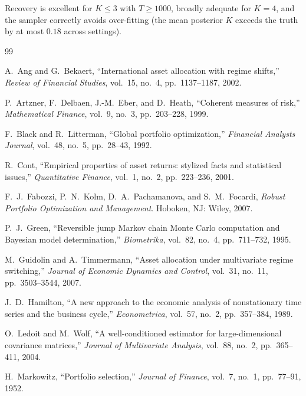 \documentclass[12pt,oneside]{book}
\begin{document}
Recovery is excellent for $K \leq 3$ with $T \geq 1000$, broadly adequate for $K=4$, and the sampler correctly avoids over-fitting (the mean posterior $K$ exceeds the truth by at most $0.18$ across settings).

\begin{thebibliography}{99}

 A.\ Ang and G.\ Bekaert, ``International asset allocation with regime shifts,'' \textit{Review of Financial Studies}, vol.\ 15, no.\ 4, pp.\ 1137--1187, 2002.

 P.\ Artzner, F.\ Delbaen, J.-M.\ Eber, and D.\ Heath, ``Coherent measures of risk,'' \textit{Mathematical Finance}, vol.\ 9, no.\ 3, pp.\ 203--228, 1999.

 F.\ Black and R.\ Litterman, ``Global portfolio optimization,'' \textit{Financial Analysts Journal}, vol.\ 48, no.\ 5, pp.\ 28--43, 1992.

 R.\ Cont, ``Empirical properties of asset returns: stylized facts and statistical issues,'' \textit{Quantitative Finance}, vol.\ 1, no.\ 2, pp.\ 223--236, 2001.

 F.\ J.\ Fabozzi, P.\ N.\ Kolm, D.\ A.\ Pachamanova, and S.\ M.\ Focardi, \textit{Robust Portfolio Optimization and Management}. Hoboken, NJ: Wiley, 2007.

 P.\ J.\ Green, ``Reversible jump Markov chain Monte Carlo computation and Bayesian model determination,'' \textit{Biometrika}, vol.\ 82, no.\ 4, pp.\ 711--732, 1995.

 M.\ Guidolin and A.\ Timmermann, ``Asset allocation under multivariate regime switching,'' \textit{Journal of Economic Dynamics and Control}, vol.\ 31, no.\ 11, pp.\ 3503--3544, 2007.

 J.\ D.\ Hamilton, ``A new approach to the economic analysis of nonstationary time series and the business cycle,'' \textit{Econometrica}, vol.\ 57, no.\ 2, pp.\ 357--384, 1989.

 O.\ Ledoit and M.\ Wolf, ``A well-conditioned estimator for large-dimensional covariance matrices,'' \textit{Journal of Multivariate Analysis}, vol.\ 88, no.\ 2, pp.\ 365--411, 2004.

 H.\ Markowitz, ``Portfolio selection,'' \textit{Journal of Finance}, vol.\ 7, no.\ 1, pp.\ 77--91, 1952.


\end{thebibliography}
\end{document}

